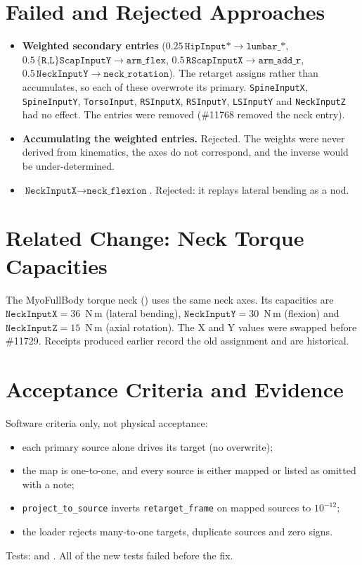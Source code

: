 \documentclass[11pt,a4paper]{article}
\begin{document}
\section{Failed and Rejected Approaches}

\begin{itemize}
  \item \textbf{Weighted secondary entries} ($0.25\,\texttt{HipInput*}\to
    \texttt{lumbar\_*}$, $0.5\,\texttt{\{R,L\}ScapInputY}\to\texttt{arm\_flex}$,
    $0.5\,\texttt{RScapInputX}\to\texttt{arm\_add\_r}$,
    $0.5\,\texttt{NeckInputY}\to\texttt{neck\_rotation}$). The retarget assigns
    rather than accumulates, so each of these overwrote its primary.
    \texttt{SpineInputX}, \texttt{SpineInputY}, \texttt{TorsoInput},
    \texttt{RSInputX}, \texttt{RSInputY}, \texttt{LSInputY} and
    \texttt{NeckInputZ} had no effect. The entries were removed (\#11768
    removed the neck entry).
  \item \textbf{Accumulating the weighted entries.} Rejected. The weights were
    never derived from kinematics, the axes do not correspond, and the inverse
    would be under-determined.
  \item \textbf{$\texttt{NeckInputX}\to\texttt{neck\_flexion}$}. Rejected: it
    replays lateral bending as a nod.
\end{itemize}

\section{Related Change: Neck Torque Capacities}

The MyoFullBody torque neck
() uses the same neck axes.
Its capacities are $\texttt{NeckInputX}=36$~N\,m (lateral bending),
$\texttt{NeckInputY}=30$~N\,m (flexion) and $\texttt{NeckInputZ}=15$~N\,m
(axial rotation). The X and Y values were swapped before \#11729. Receipts
produced earlier record the old assignment and are historical.

\section{Acceptance Criteria and Evidence}

Software criteria only, not physical acceptance:
\begin{itemize}[nosep]
  \item each primary source alone drives its target (no overwrite);
  \item the map is one-to-one, and every source is either mapped or listed as
    omitted with a note;
  \item \texttt{project\_to\_source} inverts \texttt{retarget\_frame} on mapped
    sources to $10^{-12}$;
  \item the loader rejects many-to-one targets, duplicate sources and zero
    signs.
\end{itemize}
Tests:  and
. All of the new
tests failed before the fix.
\end{document}

